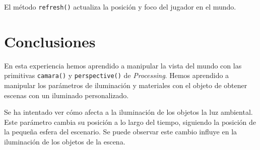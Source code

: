 \documentclass[10pt,a4paper]{report}
\begin{document}
	El método \texttt{refresh()} actualiza la posición y foco del jugador en el mundo.
	
	 
	
	\chapter{Conclusiones}	
	En esta experiencia hemos aprendido a manipular la vista del mundo con las primitivas \texttt{camara()} y \texttt{perspective()} de \textit{Processing}. Hemos aprendido a manipular los parámetros de iluminación y materiales con el objeto de obtener escenas con un iluminado personalizado.
	
	Se ha intentado ver cómo afecta a la iluminación de los objetos la luz ambiental. Este parámetro cambia su posición a lo largo del tiempo, siguiendo la posición de la pequeña esfera del escenario. Se puede observar este cambio influye en la iluminación de los objetos de la escena.
	
	
\end{document}
